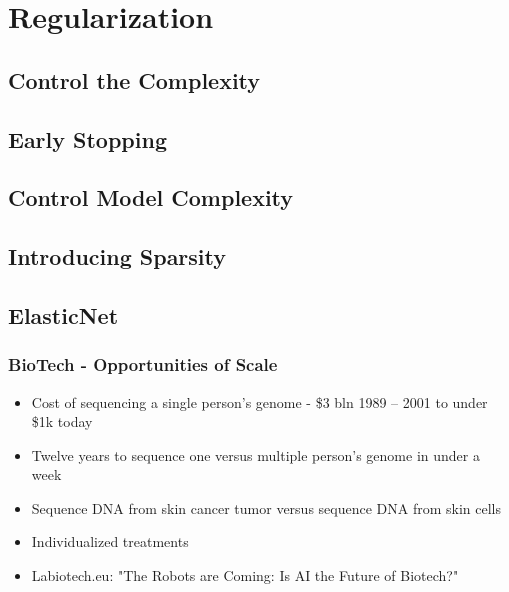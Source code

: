 \documentclass{beamer}
\begin{document}
\section{Regularization}
\subsection{Control the Complexity}
\subsection{Early Stopping}
\subsection{Control Model Complexity}
\subsection{Introducing Sparsity}
\subsection{ElasticNet}

%

\begin{frame}
\frametitle{BioTech - Opportunities of Scale}
\begin{itemize}
\item Cost of sequencing a single person's genome - \$3 bln 1989 -- 2001 to under \$1k today
\item Twelve years to sequence one versus multiple person's genome in under a week
\item Sequence DNA from skin cancer tumor versus sequence DNA from skin cells
\item Individualized treatments
\item Labiotech.eu: "The Robots are Coming: Is AI the Future of Biotech?"
\end{itemize}
\end{frame}
\end{document}
